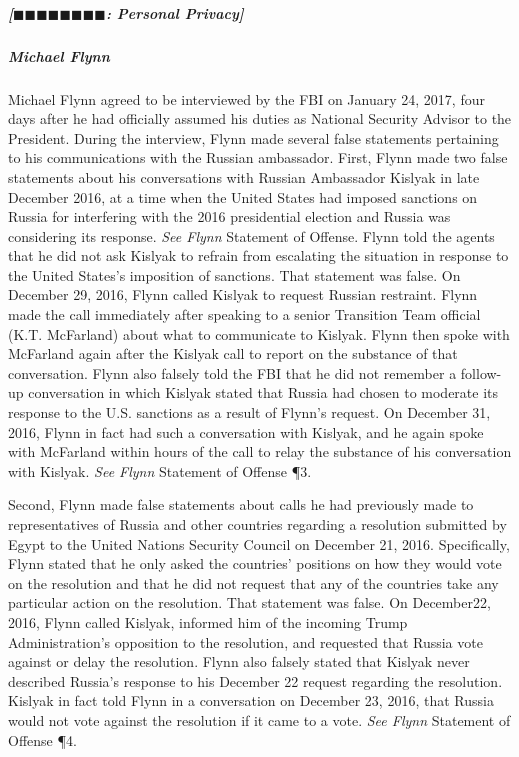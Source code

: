\subparagraph{[$\blacksquare\blacksquare\blacksquare\blacksquare\blacksquare\blacksquare\blacksquare\blacksquare$: Personal Privacy]}


\subparagraph{Michael Flynn}
Michael Flynn agreed to be interviewed by the FBI on January 24, 2017, four days after he had officially assumed his duties as National Security Advisor to the President.
During the interview, Flynn made several false statements pertaining to his communications with the Russian ambassador.
First, Flynn made two false statements about his conversations with Russian Ambassador Kislyak in late December 2016, at a time when the United States had imposed sanctions on Russia for interfering with the 2016 presidential election and Russia was considering its response.
\textit{See Flynn} Statement of Offense.
Flynn told the agents that he did not ask Kislyak to refrain from escalating the situation in response to the United States's imposition of sanctions.
That statement was false.
On December 29, 2016, Flynn called Kislyak to request Russian restraint.
Flynn made the call immediately after speaking to a senior Transition Team official (K.T. McFarland) about what to communicate to Kislyak.
Flynn then spoke with McFarland again after the Kislyak call to report on the substance of that conversation.
Flynn also falsely told the FBI that he did not remember a follow-up conversation in which Kislyak stated that Russia had chosen to moderate its response to the U.S. sanctions as a result of Flynn's request.
On December 31, 2016, Flynn in fact had such a conversation with Kislyak, and he again spoke with McFarland within hours of the call to relay the substance of his conversation with Kislyak.
\textit{See Flynn} Statement of Offense \P 3.

Second, Flynn made false statements about calls he had previously made to representatives of Russia and other countries regarding a resolution submitted by Egypt to the United Nations Security Council on December 21, 2016.
Specifically, Flynn stated that he only asked the countries' positions on how they would vote on the resolution and that he did not request that any of the countries take any particular action on the resolution.
That statement was false.
On December22, 2016, Flynn called Kislyak, informed him of the incoming Trump Administration's opposition to the resolution, and requested that Russia vote against or delay the resolution.
Flynn also falsely stated that Kislyak never described Russia's response to his December 22 request regarding the resolution.
Kislyak in fact told Flynn in a conversation on December 23, 2016, that Russia would not vote against the resolution if it came to a vote.
\textit{See Flynn} Statement of Offense \P 4.

